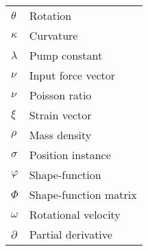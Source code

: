 \begin{spacing}{0.9}
\begin{multicols}{2}
\begin{table}[H]
\begin{tabular}{p{2.8cm} p{3.2cm}}
    $\theta$      & Rotation \\
    $\kappa$     &  Curvature \\
    $\lambda$    &  Pump constant \\
    $\nu$     &  Input force vector \\
    $\nu$     &  Poisson ratio \\
    $\xi$     &  Strain vector \\
    $\rho$     &  Mass density \\
    $\sigma$     &  Position instance \\
    $\varphi$     &  Shape-function \\
    $\Phi$    &  Shape-function matrix \\
    $\omega$     &  Rotational velocity \\
    $\partial$     &  Partial derivative \\ \hline
    
    \end{tabular}
\end{table}



\end{multicols}
\end{spacing}
